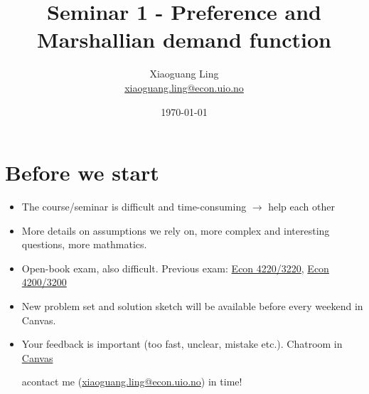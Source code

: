\documentclass{article}
\title{Seminar 1 - Preference and Marshallian demand function}
\author{Xiaoguang Ling \\  \href{xiaoguang.ling@econ.uio.no}{xiaoguang.ling@econ.uio.no}}
\date{\today}
\begin{document}
\maketitle

\section{Before we start}

\begin{itemize}
\item The course/seminar is difficult and time-consuming $\rightarrow$ help each other
\item More details on assumptions we rely on, more complex and interesting questions, more mathmatics.
\item Open-book exam, also difficult. Previous exam: \href{https://www.uio.no/studier/emner/sv/oekonomi/ECON4220/previous-exams/}{Econ 4220/3220}, \href{https://www.uio.no/studier/emner/sv/oekonomi/ECON3200/previous-exams/index.html}{Econ 4200/3200}
\item New problem set and solution sketch will be available before every weekend in Canvas.
\item Your feedback is important (too fast, unclear, mistake etc.). Chatroom in \href{}{Canvas}

acontact me (\href{xiaoguang.ling@econ.uio.no}{xiaoguang.ling@econ.uio.no}) in time!




\end{itemize}



\usetikzlibrary{arrows,shapes,positioning,shadows,trees}

\end{document}
